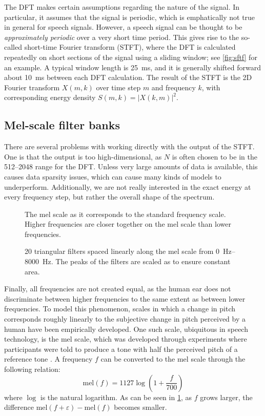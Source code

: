 The DFT makes certain assumptions regarding the nature of the signal.
In particular, it assumes that the signal is periodic, which is emphatically not true in general for speech signals.
However, a speech signal can be thought to be \emph{approximately periodic} over a very short time period.
This gives rise to the so-called short-time Fourier transform (STFT), where the DFT is calculated repeatedly on short sections of the signal using a sliding window; see \cref{fig:sftf} for an example.
A typical window length is \SI{25}{\ms}, and it is generally shifted forward about \SI{10}{\ms} between each DFT calculation.
The result of the STFT is the 2D Fourier transform $X(m,k)$ over time step $m$ and frequency $k$, with corresponding energy density $S(m,k) = \left|X(k,m)\right|^2$.

\subsection{Mel-scale filter banks}

There are several problems with working directly with the output of the STFT. One is that the output is too high-dimensional, as $N$ is often chosen to be in the \numrange{512}{2048} range for the DFT.
Unless very large amounts of data is available, this causes data sparsity issues, which can cause many kinds of models to underperform.
Additionally, we are not really interested in the exact energy at every frequency step, but 
rather the overall shape of the spectrum.

\begin{figure}
  \centering
  
  \caption{\label{fig:melscale}The mel scale as it corresponds to the standard frequency scale.
  Higher frequencies are closer together on the mel scale than lower frequencies.}
\end{figure}

\begin{figure}
  \centering
  
  \caption{\label{fig:filterbank}20 triangular filters spaced linearly along the mel scale from \SIrange{0}{8000}{\Hz}.
  The peaks of the filters are scaled as to ensure constant area.}
\end{figure}

Finally, all frequencies are not created equal, as the human ear does not discriminate between higher frequencies to the same extent as between lower frequencies.
To model this phenomenon, scales in which a change in pitch corresponds roughly linearly to the subjective change in pitch perceived by a human have been empirically developed.
One such scale, ubiquitous in speech technology, is the mel scale, which was developed through experiments where participants were told to produce a tone with half the perceived pitch of a reference tone \parencite{stevens1937scale}.
A frequency $f$ can be converted to the mel scale through the following relation:
\[
  \mathrm{mel}(f) = 1127\log\left(1 + \frac{f}{700}\right)
\]
where $\log$ is the natural logarithm.
As can be seen in \cref{fig:melscale}, as $f$ grows larger, the difference $\mathrm{mel}(f+\varepsilon) - \mathrm{mel}(f)$ becomes smaller.

